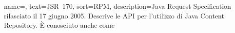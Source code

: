 
\renewcommand{\acronymname}{Acronimi e abbreviazioni}





 {
	name=,
	text=\mbox{JSR 170},
	sort=RPM,
	description={Java Request Specification rilasciato il 17 giugno 2005. Descrive le API per l'utilizzo di Java Content Repository. È conosciuto anche come }
}



